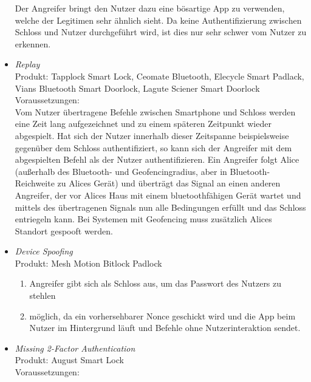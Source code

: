 \begin{itemize}[leftmargin=0cm,label={}]
                Der Angreifer bringt den Nutzer dazu eine bösartige App zu verwenden, welche der Legitimen sehr ähnlich sieht. 
                Da keine Authentifizierung zwischen Schloss und Nutzer durchgeführt wird, ist dies nur sehr schwer vom Nutzer zu erkennen.
            \item \emph{Replay}\cite{Tierney2018,Rose2016,Ho2016}\label{vuln:replay}\\
                Produkt: Tapplock Smart Lock, Ceomate Bluetooth, Elecycle Smart Padlack, Vians Bluetooth Smart Doorlock, Lagute Sciener Smart Doorlock\\
                Voraussetzungen: \\  
                Vom Nutzer übertragene Befehle zwischen Smartphone und Schloss werden eine Zeit lang aufgezeichnet und zu einem späteren Zeitpunkt wieder abgespielt. 
                Hat sich der Nutzer innerhalb dieser Zeitspanne beispielsweise gegenüber dem Schloss authentifiziert, so kann sich der Angreifer mit dem abgespielten Befehl als der Nutzer authentifizieren.
                Ein Angreifer folgt Alice (außerhalb des Bluetooth- und Geofencingradius, aber in Bluetooth-Reichweite zu Alices Gerät) und überträgt das Signal an einen anderen Angreifer, der vor Alices Haus mit einem bluetoothfähigen Gerät wartet und mittels des übertragenen Signals nun alle Bedingungen erfüllt und das Schloss entriegeln kann.
                Bei Systemen mit Geofencing muss zusätzlich Alices Standort gespooft werden.
            \item \emph{Device Spoofing}\cite{Rose2016}\label{vuln:spoofing}\\
                Produkt: Mesh Motion Bitlock Padlock\\
                \begin{enumerate}[noitemsep]
    	            \item Angreifer gibt sich als Schloss aus, um das Passwort des Nutzers zu stehlen
    	            \item möglich, da ein vorhersehbarer Nonce geschickt wird und die App beim Nutzer im Hintergrund läuft und Befehle ohne Nutzerinteraktion sendet.
    	        \end{enumerate}
	        \item \emph{Missing 2-Factor Authentication}\cite{Jmaxxz2015}\label{vuln:2factor}\\
                Produkt: August Smart Lock\\
                Voraussetzungen: \\  

\end{itemize}
